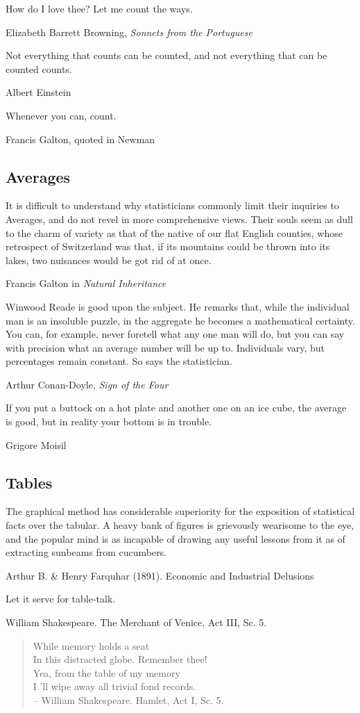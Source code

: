 \epigraph{How do I love thee? Let me count the ways.}{Elizabeth Barrett Browning, \emph{Sonnets from the Portuguese}}

\epigraph{Not everything that counts can be counted, and not everything that can be counted counts.}{Albert Einstein}

\epigraph{Whenever you can, count.}{Francis Galton, quoted in Newman}

\subsection{Averages}

\epigraph{It is difficult to understand why statisticians commonly limit their inquiries to Averages, and do not revel in more comprehensive views. Their souls seem as dull to the charm of variety as that of the native of our flat English counties, whose retrospect of Switzerland was that, if its mountains could be thrown into its lakes, two nuisances would be got rid of at once.}{Francis Galton in \emph{Natural Inheritance}}


\epigraph{Winwood Reade is good upon the subject. He remarks that, while the individual man is an insoluble puzzle, in the aggregate he becomes a mathematical certainty. You can, for example, never foretell what any one man will do, but you can say with precision what an average number will be up to. Individuals vary, but percentages remain constant. So says the statistician.}{Arthur Conan-Doyle, \emph{Sign of the Four}}

\epigraph{If you put a buttock on a hot plate and another one on an ice cube, the average is good, but in reality your bottom is in trouble.}{Grigore Moisil}

\subsection{Tables}

\epigraph{The graphical method has considerable superiority for the exposition of statistical facts over the tabular. A heavy bank of figures is grievously wearisome to the eye, and the popular mind is as incapable of drawing any useful lessons from it as of extracting sunbeams from cucumbers.}{Arthur B. \& Henry Farquhar (1891). Economic and Industrial Delusions \citet[p. 55]{FaquharFaquhar:1891}}


\epigraph{Let it serve for table-talk.}{William Shakespeare. The Merchant of Venice, Act III, Sc. 5.}

	\begin{verse}
	While memory holds a seat \\
	In this distracted globe. Remember thee! \\
	Yea, from the table of my memory \\
	I 'll wipe away all trivial fond records. \\
-- William Shakespeare. Hamlet, Act I, Sc. 5.
	\end{verse}

